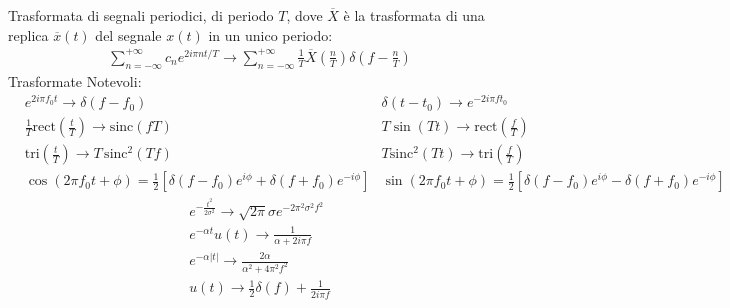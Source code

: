 \documentclass{article}
\newcommand{\rect}{\mathrm{rect}}
\newcommand{\sinc}{\mathrm{sinc}}
\newcommand{\tri}{\mathrm{tri}}
\newcommand{\suminf}{\displaystyle\sum_{n=-\infty}^{+\infty}}
\begin{document}
Trasformata di segnali periodici, di periodo $T$, dove $\overline{X}$ è la trasformata di una replica $\overline{x}(t)$ del segnale $x(t)$ in un unico periodo:
\begin{gather*}
    \suminf c_ne^{2i\pi nt/T}\to\suminf \frac{1}{T}\overline{X}\left(\frac{n}{T}\right)\delta\left(f-\frac{n}{T}\right)
\end{gather*}
Trasformate Notevoli:
\begin{align*}
    &e^{2i\pi f_0 t}\to\delta(f-f_0)&\delta(t-t_0)\to e^{-2i\pi ft_0}\\
    &\displaystyle\frac{1}{T}\rect\left(\frac{t}{T}\right)\to\sinc(fT)
    &T\sin(Tt)\to\displaystyle\rect\left(\frac{f}{T}\right)\\
    &\tri\displaystyle\left(\frac{t}{T}\right)\to T\,\sinc^2(Tf)
    &T\sinc^2(Tt)\to\tri\left(\displaystyle\frac{f}{T}\right)\\
    &\cos\left(\displaystyle2\pi f_0t+\phi\right)=\frac{1}{2}\left[\delta(f-f_0)e^{i\phi}+\delta(f+f_0)e^{-i\phi}\right]
    &\sin\left(\displaystyle2\pi f_0t+\phi\right)=\frac{1}{2}\left[\delta(f-f_0)e^{i\phi}-\delta(f+f_0)e^{-i\phi}\right]
\end{align*}
\begin{gather*}
    e^{-\frac{t^2}{2\sigma^2}}\to\sqrt{2\pi}\sigma e^{-2\pi^2\sigma^2f^2}\\
    e^{-\alpha t}u(t)\to\displaystyle\frac{1}{\alpha+2i\pi f}\\
    e^{-\alpha|t|}\to\displaystyle\frac{2\alpha}{\alpha^2+4\pi^2 f^2}\\
    u(t)\to\displaystyle\frac{1}{2}\delta(f)+\frac{1}{2i\pi f}\\
\end{gather*}
\end{document}
